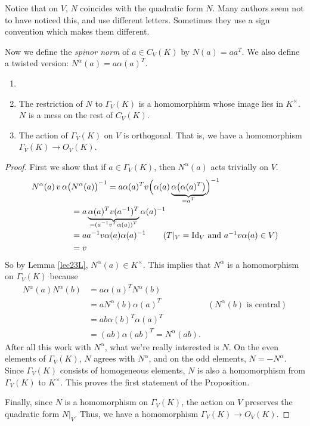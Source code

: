    Notice that on $V$, $N$ coincides with the quadratic form $N$. Many authors seem not
   to have noticed this, and use different letters. Sometimes they use a sign
   convention which makes them different.

   Now we define the \emph{spinor norm} of $a\in C_V(K)$ by
   $N(a)=aa^T$. We also define a twisted version: $N^\alpha(a)=a\alpha(a)^T$.
   \begin{proposition}
   \begin{enumerate}\item[]
     \item The restriction of $N$ to $\Gamma_V(K)$ is a homomorphism whose image lies in
     $K^\times$. $N$ is a mess on the rest of $C_V(K)$.

     \item The action of $\Gamma_V(K)$ on $V$ is orthogonal. That is, we have a
     homomorphism $\Gamma_V(K)\to O_V(K)$.
   \end{enumerate}
   \end{proposition}
   \begin{proof}
    First we show that if $a\in \Gamma_V(K)$, then $N^\alpha(a)$ acts trivially on $V$.
    \begin{align*}
        N^\alpha(a)\, v\, \alpha\bigl(&N^\alpha(a)\bigr)^{-1} =
            a\alpha(a)^T v \Bigl( \alpha(a)\underbrace{\alpha\bigl(\alpha(a)^T\bigr)}_{\smash{=a^T}}
            \Bigr)^{-1}\\
        &= a\underbrace{\alpha(a)^T v (a^{-1})^T}_{
            \smash{=(a^{-1}v^T \alpha(a))^T}} \alpha(a)^{-1} \\
        &= a a^{-1} v \alpha(a)\alpha(a)^{-1} & \hspace*{6em}
            \llap{($T|_V=\id_V$ and $a^{-1}v\alpha(a)\in V$)}\\
        &= v
    \end{align*}
    So by Lemma \ref{lec23L}, $N^\alpha(a)\in K^\times$. This implies that $N^\alpha$ is
    a homomorphism on $\Gamma_V(K)$ because
    \begin{align*}
      N^\alpha(a)N^\alpha(b) &= a\alpha(a)^T N^\alpha(b) \\
       & = aN^\alpha(b) \alpha(a)^T & (N^\alpha(b) \text{ is central})\\
       & = ab\alpha(b)^T\alpha(a)^T\\
       &=(ab)\alpha(ab)^T=N^\alpha(ab).
    \end{align*}
    After all this work with $N^\alpha$, what we're really interested is $N$. On the even
    elements of $\Gamma_V(K)$, $N$ agrees with $N^\alpha$, and on the odd elements,
    $N=-N^\alpha$. Since $\Gamma_V(K)$ consists of homogeneous elements, $N$ is also a
    homomorphism from $\Gamma_V(K)$ to $K^\times$. This proves the first statement of the
    Proposition.

    Finally, since $N$ is a homomorphism on $\Gamma_V(K)$, the action on $V$ preserves
    the quadratic form $N|_V$. Thus, we have a homomorphism $\Gamma_V(K)\to O_V(K)$.
 \end{proof}
